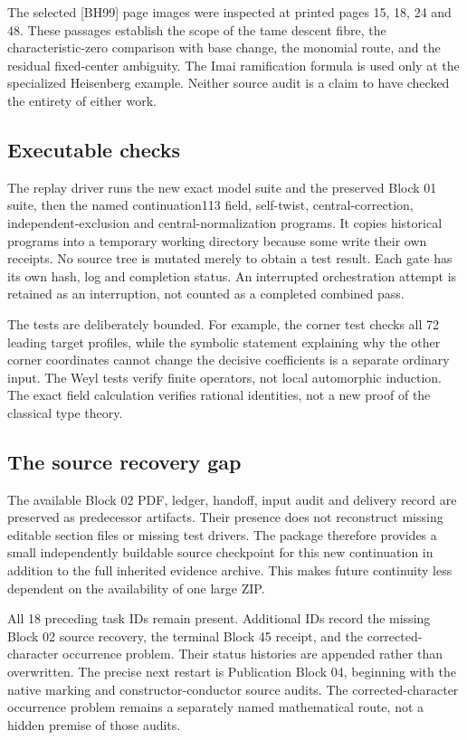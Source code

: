 \documentclass[11pt]{article}
\theoremstyle{definition}\newtheorem{definition}[proposition]{Definition}
\begin{document}
The selected [BH99] page images were inspected at printed pages 15, 18, 24 and 48. These passages establish the scope of the tame descent fibre, the characteristic-zero comparison with base change, the monomial route, and the residual fixed-center ambiguity. The Imai ramification formula is used only at the specialized Heisenberg example. Neither source audit is a claim to have checked the entirety of either work.

\subsection{Executable checks}
The replay driver runs the new exact model suite and the preserved Block 01 suite, then the named continuation113 field, self-twist, central-correction, independent-exclusion and central-normalization programs. It copies historical programs into a temporary working directory because some write their own receipts. No source tree is mutated merely to obtain a test result. Each gate has its own hash, log and completion status. An interrupted orchestration attempt is retained as an interruption, not counted as a completed combined pass.

The tests are deliberately bounded. For example, the corner test checks all 72 leading target profiles, while the symbolic statement explaining why the other corner coordinates cannot change the decisive coefficients is a separate ordinary input. The Weyl tests verify finite operators, not local automorphic induction. The exact field calculation verifies rational identities, not a new proof of the classical type theory.

\subsection{The source recovery gap}
The available Block 02 PDF, ledger, handoff, input audit and delivery record are preserved as predecessor artifacts. Their presence does not reconstruct missing editable section files or missing test drivers. The package therefore provides a small independently buildable source checkpoint for this new continuation in addition to the full inherited evidence archive. This makes future continuity less dependent on the availability of one large ZIP.

All 18 preceding task IDs remain present. Additional IDs record the missing Block 02 source recovery, the terminal Block 45 receipt, and the corrected-character occurrence problem. Their status histories are appended rather than overwritten. The precise next restart is Publication Block 04, beginning with the native marking and constructor-conductor source audits. The corrected-character occurrence problem remains a separately named mathematical route, not a hidden premise of those audits.
\end{document}

